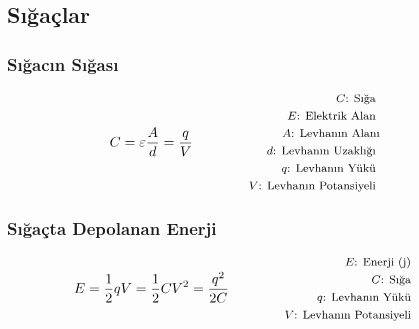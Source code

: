 \subsection{Sığaçlar}

\subsubsection*{Sığacın Sığası}
\begin{equation}
    C = \varepsilon \frac{A}{d} = \frac{q}{V} \qquad \qquad \parbox{4cm}{\footnotesize$\begin{aligned}
        C\text{: Sığa } \\
        E\text{: Elektrik Alan } \\
        A\text{: Levhanın Alanı} \\
        d\text{: Levhanın Uzaklığı } \\
        q\text{: Levhanın Yükü } \\
        V\text{: Levhanın Potansiyeli }
\end{aligned}$}
\end{equation}

\subsubsection*{Sığaçta Depolanan Enerji}
\begin{equation}
    E  = \frac{1}{2} qV = \frac{1}{2} C V^2 = \frac{q^2}{2C} \qquad \qquad \parbox{4cm}{\footnotesize$\begin{aligned}
        E\text{: Enerji (j) } \\
        C\text{: Sığa } \\
        q\text{: Levhanın Yükü } \\
        V\text{: Levhanın Potansiyeli }
\end{aligned}$}
\end{equation}
